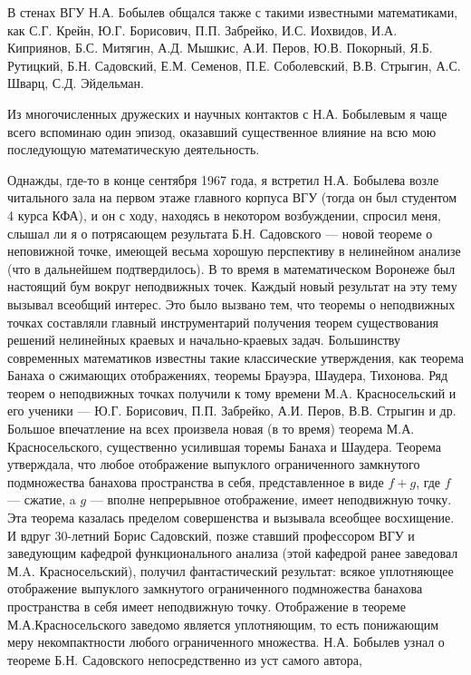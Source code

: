 В стенах ВГУ Н.А. Бобылев общался также с такими известными
математиками, как С.Г. Крейн, Ю.Г. Борисович, П.П. Забрейко, И.С.
Иохвидов, И.А. Киприянов, Б.С. Митягин,  А.Д. Мышкис, А.И. Перов,
Ю.В. Покорный, Я.Б. Рутицкий, Б.Н. Садовский, Е.М. Семенов, П.Е.
Соболевский, В.В. Стрыгин, А.С. Шварц, С.Д. Эйдельман.

Из многочисленных дружеских и научных контактов с Н.А. Бобылевым я
чаще всего вспоминаю один эпизод, оказавший существенное влияние на
всю мою последующую математическую деятельность.

Однажды, где-то в конце сентября 1967 года, я встретил Н.А. Бобылева
возле читального зала на первом этаже главного корпуса ВГУ (тогда он
был студентом 4 курса КФА), и он с ходу, находясь в некотором
возбуждении, спросил меня, слышал ли я о потрясающем результата Б.Н.
Садовского --- новой теореме о неповижной точке, имеющей весьма
хорошую перспективу в нелинейном анализе (что в дальнейшем
подтвердилось). В то время в математическом Воронеже был настоящий
бум вокруг неподвижных точек. Каждый новый результат на эту тему
вызывал всеобщий интерес. Это было вызвано тем, что теоремы о
неподвижных точках составляли главный инструментарий получения
теорем существования решений нелинейных краевых и
на\-чаль\-но-крае\-вых задач. Большинству современных математиков
известны такие классические утверждения, как теорема Банаха о
сжимающих отображениях, теоремы Брауэра, Шаудера, Тихонова. Ряд
теорем о неподвижных точках получили к тому времени М.A.
Красносельский и его ученики --- Ю.Г. Борисович, П.П. Забрейко, А.И.
Перов, В.В. Стрыгин и др. Большое впечатление на всех произвела
новая (в то время) теорема М.А. Красносельского, существенно
усилившая торемы Банаха и Шаудера. Теорема утверждала, что любое
отображение выпуклого ограниченного замкнутого подмножества банахова
пространства в себя, представленное в виде $f+g$, где $f$ ---
сжатие, a $g$ --- вполне непрерывное отображение, имеет неподвижную
точку. Эта теорема казалась пределом совершенства и вызывала
всеобщее восхищение. И вдруг 30-летний Борис Садовский, позже
ставший профессором ВГУ и заведующим кафедрой функционального
анализа (этой кафедрой ранее заведовал М.A. Красносельский), получил
фантастический результат: всякое уплотняющее отображение выпуклого
замкнутого ограниченного подмножества банахова пространства в себя
имеет неподвижную точку. Отображение в теореме М.А.Красносельского
заведомо является уплотняющим, то есть понижающим меру
некомпактности любого ограниченного множества. Н.А. Бобылев узнал о
теореме Б.Н. Садовского непосредственно из уст самого автора,
